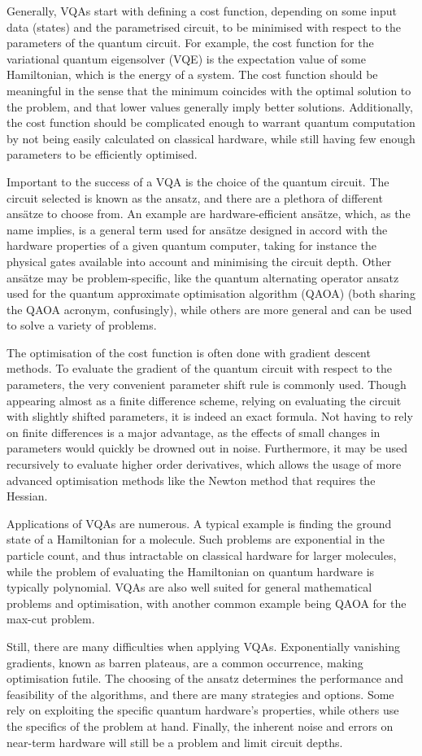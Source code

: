 Generally, VQAs start with defining a cost function, depending on some input data (states) and the parametrised circuit, to be minimised with respect to the parameters of the quantum circuit.
For example, the cost function for the variational quantum eigensolver (VQE) is the expectation value of some Hamiltonian, which is the energy of a system.
The cost function should be meaningful in the sense that the minimum coincides with the optimal solution to the problem, and that lower values generally imply better solutions.
Additionally, the cost function should be complicated enough to warrant quantum computation by not being easily calculated on classical hardware, while still having few enough parameters to be efficiently optimised.

Important to the success of a VQA is the choice of the quantum circuit.
The circuit selected is known as the ansatz, and there are a plethora of different ansätze to choose from.
An example are hardware-efficient ansätze, which, as the name implies, is a general term used for ansätze designed in accord with the hardware properties of a given quantum computer, taking for instance the physical gates available into account and minimising the circuit depth.
Other ansätze may be problem-specific, like the quantum alternating operator ansatz used for the quantum approximate optimisation algorithm (QAOA) (both sharing the QAOA acronym, confusingly), while others are more general and can be used to solve a variety of problems.

The optimisation of the cost function is often done with gradient descent methods.
To evaluate the gradient of the quantum circuit with respect to the parameters, the very convenient parameter shift rule is commonly used.
Though appearing almost as a finite difference scheme, relying on evaluating the circuit with slightly shifted parameters, it is indeed an exact formula.
Not having to rely on finite differences is a major advantage, as the effects of small changes in parameters would quickly be drowned out in noise.
Furthermore, it may be used recursively to evaluate higher order derivatives, which allows the usage of more advanced optimisation methods like the Newton method that requires the Hessian.

Applications of VQAs are numerous.
A typical example is finding the ground state of a Hamiltonian for a molecule.
Such problems are exponential in the particle count, and thus intractable on classical hardware for larger molecules, while the problem of evaluating the Hamiltonian on quantum hardware is typically polynomial.
VQAs are also well suited for general mathematical problems and optimisation, with another common example being QAOA for the max-cut problem.

Still, there are many difficulties when applying VQAs.
Exponentially vanishing gradients, known as barren plateaus, are a common occurrence, making optimisation futile.
The choosing of the ansatz determines the performance and feasibility of the algorithms, and there are many strategies and options.
Some rely on exploiting the specific quantum hardware's properties, while others use the specifics of the problem at hand.
Finally, the inherent noise and errors on near-term hardware will still be a problem and limit circuit depths.